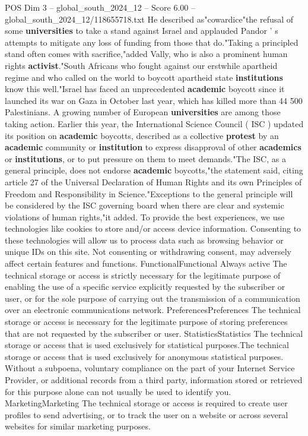 \begin{textsample}{POS Dim 3 – global\_south\_2024\_12 – Score 6.00 – global\_south\_2024\_12/118655718.txt}
He described as"cowardice"the refusal of some \textbf{universities} to take a stand against Israel and applauded Pandor ' s attempts to mitigate any loss of funding from those that do."Taking a principled stand often comes with sacrifice,"added Vally, who is also a prominent human rights \textbf{activist}."South Africans who fought against our erstwhile apartheid regime and who called on the world to boycott apartheid state \textbf{institutions} know this well."Israel has faced an unprecedented \textbf{academic} boycott since it launched its war on Gaza in October last year, which has killed more than 44 500 Palestinians.
A growing number of European \textbf{universities} are among those taking action.
Earlier this year, the International Science Council ( ISC ) updated its position on \textbf{academic} boycotts, described as a collective \textbf{protest} by an \textbf{academic} community or \textbf{institution} to express disapproval of other \textbf{academics} or \textbf{institutions}, or to put pressure on them to meet demands."The ISC, as a general principle, does not endorse \textbf{academic} boycotts,"the statement said, citing article 27 of the Universal Declaration of Human Rights and its own Principles of Freedom and Responsibility in Science."Exceptions to the general principle will be considered by the ISC governing board when there are clear and systemic violations of human rights,"it added.
To provide the best experiences, we use technologies like cookies to store and/or access device information.
Consenting to these technologies will allow us to process data such as browsing behavior or unique IDs on this site.
Not consenting or withdrawing consent, may adversely affect certain features and functions.
FunctionalFunctional Always active The technical storage or access is strictly necessary for the legitimate purpose of enabling the use of a specific service explicitly requested by the subscriber or user, or for the sole purpose of carrying out the transmission of a communication over an electronic communications network.
PreferencesPreferences The technical storage or access is necessary for the legitimate purpose of storing preferences that are not requested by the subscriber or user.
StatisticsStatistics The technical storage or access that is used exclusively for statistical purposes.The technical storage or access that is used exclusively for anonymous statistical purposes.
Without a subpoena, voluntary compliance on the part of your Internet Service Provider, or additional records from a third party, information stored or retrieved for this purpose alone can not usually be used to identify you.
MarketingMarketing The technical storage or access is required to create user profiles to send advertising, or to track the user on a website or across several websites for similar marketing purposes.

\end{textsample}
